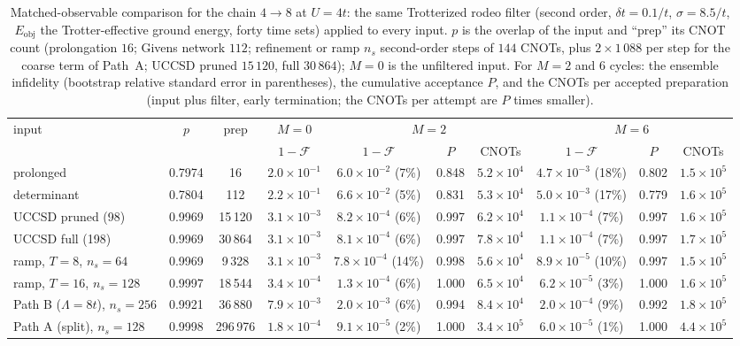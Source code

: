 \documentclass[a4paper,11pt,noarxiv]{quantumarticle}
\newcommand{\Eobj}{E_{\mathrm{obj}}}
\begin{document}
\begin{table}[t]
  \caption{Matched-observable comparison for the chain $4\to8$ at $U=4t$:
  the same Trotterized rodeo filter (second order, $\delta t=0.1/t$,
  $\sigma=8.5/t$, $\Eobj$ the Trotter-effective ground energy, forty time
  sets) applied to every input.  $p$ is the overlap of the input and
  ``prep'' its CNOT count (prolongation $16$; Givens network $112$;
  refinement or ramp $n_s$ second-order steps of $144$ CNOTs, plus
  $2\times1\,088$ per step for the coarse term of Path~A; UCCSD pruned
  $15\,120$, full $30\,864$); $M=0$ is the unfiltered input.  For $M=2$ and
  $6$ cycles: the ensemble infidelity (bootstrap relative standard error in
  parentheses), the cumulative acceptance $P$, and the CNOTs per accepted
  preparation (input plus filter, early termination; the CNOTs per attempt
  are $P$ times smaller).}
  \label{tab:budget}
  \centering\scriptsize
  \setlength{\tabcolsep}{2.5pt}
  \begin{tabular}{lcc|c|ccc|ccc}
  \toprule
  input & $p$ & prep & $M=0$ & \multicolumn{3}{c|}{$M=2$} & \multicolumn{3}{c}{$M=6$}\\
  & & & $1-\mathcal F$ & $1-\mathcal F$ & $P$ & CNOTs & $1-\mathcal F$ & $P$ & CNOTs\\
  \midrule
  prolonged & 0.7974 & 16 & $2.0{\times}10^{-1}$ & $6.0{\times}10^{-2}$ (7\%) & 0.848 & $5.2{\times}10^{4}$ & $4.7{\times}10^{-3}$ (18\%) & 0.802 & $1.5{\times}10^{5}$\\
  determinant & 0.7804 & 112 & $2.2{\times}10^{-1}$ & $6.6{\times}10^{-2}$ (5\%) & 0.831 & $5.3{\times}10^{4}$ & $5.0{\times}10^{-3}$ (17\%) & 0.779 & $1.6{\times}10^{5}$\\
  UCCSD pruned (98) & 0.9969 & 15\,120 & $3.1{\times}10^{-3}$ & $8.2{\times}10^{-4}$ (6\%) & 0.997 & $6.2{\times}10^{4}$ & $1.1{\times}10^{-4}$ (7\%) & 0.997 & $1.6{\times}10^{5}$\\
  UCCSD full (198) & 0.9969 & 30\,864 & $3.1{\times}10^{-3}$ & $8.1{\times}10^{-4}$ (6\%) & 0.997 & $7.8{\times}10^{4}$ & $1.1{\times}10^{-4}$ (7\%) & 0.997 & $1.7{\times}10^{5}$\\
  ramp, $T=8$, $n_s=64$ & 0.9969 & 9\,328 & $3.1{\times}10^{-3}$ & $7.8{\times}10^{-4}$ (14\%) & 0.998 & $5.6{\times}10^{4}$ & $8.9{\times}10^{-5}$ (10\%) & 0.997 & $1.5{\times}10^{5}$\\
  ramp, $T=16$, $n_s=128$ & 0.9997 & 18\,544 & $3.4{\times}10^{-4}$ & $1.3{\times}10^{-4}$ (6\%) & 1.000 & $6.5{\times}10^{4}$ & $6.2{\times}10^{-5}$ (3\%) & 1.000 & $1.6{\times}10^{5}$\\
  Path B ($\Lambda=8t$), $n_s=256$ & 0.9921 & 36\,880 & $7.9{\times}10^{-3}$ & $2.0{\times}10^{-3}$ (6\%) & 0.994 & $8.4{\times}10^{4}$ & $2.0{\times}10^{-4}$ (9\%) & 0.992 & $1.8{\times}10^{5}$\\
  Path A (split), $n_s=128$ & 0.9998 & 296\,976 & $1.8{\times}10^{-4}$ & $9.1{\times}10^{-5}$ (2\%) & 1.000 & $3.4{\times}10^{5}$ & $6.0{\times}10^{-5}$ (1\%) & 1.000 & $4.4{\times}10^{5}$\\
  \bottomrule
  \end{tabular}
\end{table}
\end{document}
